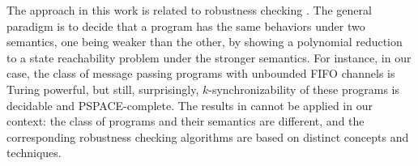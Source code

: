 The approach in this work is related to robustness checking \cite{DBLP:conf/se/BouajjaniDM14,DBLP:conf/esop/BouajjaniEEOT17}. The general paradigm is to decide that a program has the same behaviors under two semantics, one being weaker than the other, by showing a polynomial reduction to a state reachability problem under the stronger semantics.
For instance, in our case, the class of message passing programs with unbounded FIFO channels is Turing powerful, but still, surprisingly, $k$-synchronizability of these programs is decidable and PSPACE-complete. %
The results in \cite{DBLP:conf/se/BouajjaniDM14,DBLP:conf/esop/BouajjaniEEOT17} cannot be applied in our context:
the class of programs and their semantics are different, and the corresponding robustness checking algorithms are based on distinct concepts and techniques.

